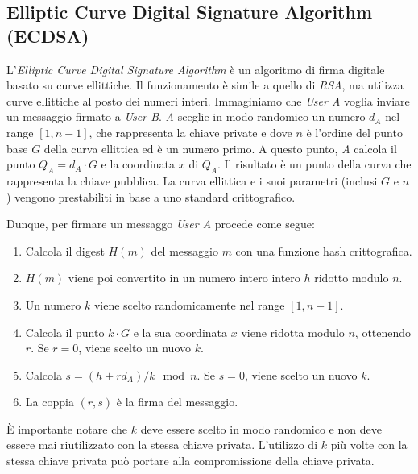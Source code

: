 \subsection{Elliptic Curve Digital Signature Algorithm (ECDSA)}
\label{cap:ecdsa}

L'\emph{Elliptic Curve Digital Signature Algorithm} è un algoritmo di firma digitale basato su curve ellittiche.
Il funzionamento è simile a quello di \emph{RSA}, ma utilizza curve ellittiche al posto dei numeri interi.
Immaginiamo che \emph{User A} voglia inviare un messaggio firmato a \emph{User B}.
\emph{A} sceglie in modo randomico un numero $d_A$ nel range $[1, n-1]$, che rappresenta la chiave private e dove $n$ è l'ordine del punto base $G$ della curva ellittica ed è un numero primo.
A questo punto, \emph{A} calcola il punto $Q_A = d_A \cdot G$ e la coordinata $x$ di $Q_A$. Il risultato è un punto della curva che rappresenta la chiave pubblica.
La curva ellittica e i suoi parametri (inclusi $G$ e $n$) vengono prestabiliti in base a uno standard crittografico.

\noindent Dunque, per firmare un messaggo \emph{User A} procede come segue:
\begin{enumerate} %
	\item Calcola il digest $H(m)$ del messaggio $m$ con una funzione hash crittografica.
	\item $H(m)$ viene poi convertito in un numero intero intero $h$ ridotto modulo $n$.
	\item Un numero $k$ viene scelto randomicamente nel range $[1, n-1]$.
	\item Calcola il punto $k \cdot G$ e la sua coordinata $x$ viene ridotta modulo $n$, ottenendo $r$. Se $r = 0$, viene scelto un nuovo $k$.
	\item Calcola $s = (h + rd_A)/k \mod n$. Se $s = 0$, viene scelto un nuovo $k$.
	\item La coppia $(r, s)$ è la firma del messaggio.
\end{enumerate} %

È importante notare che $k$ deve essere scelto in modo randomico e non deve essere mai riutilizzato con la stessa chiave privata.
L'utilizzo di $k$ più volte con la stessa chiave privata può portare alla compromissione della chiave privata.

